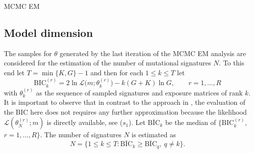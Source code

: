 \documentclass{bioinfo}
\makeatletter
\def\BState{\State\hskip-\ALG@thistlm}
\makeatother
\begin{document}
\begin{algorithm}
\caption{MCMC EM}\label{alg:mcmcem}
\end{algorithm}

\subsection{Model dimension}
The samples for $\theta$ generated by the last iteration of the
MCMC EM analysis are considered for the estimation of the number 
of mutational signatures $N$. To this end let $T = \min\{K, G\} - 1$
and then for each $1 \leq k \leq T$ let
\[
  \text{BIC}_k^{(r)} = 2\ln\mathcal L\big(m;
    \theta^{(r)}_{k}\big) - k(G+K)\ln G, \qquad r =1, \ldots,
    R
\]
with $\theta^{(r)}_k$ as the sequence of sampled signatures and
exposure matrices of rank $k$. It is important to observe that in
contrast to the approach in \cite{FICMV}, the evaluation of the BIC
here does not requires any further approximation because the
likelihood $\mathcal L(\theta^{(r)}_N; m)$ is directly available, see
($s_1$).  Let $\overline{\text{BIC}}_k$ be the median of 
$\{\text{BIC}_k^{(r)}$, $r = 1, \ldots, R\}$. The number of signatures
$N$ is estimated as
\[
   N 
   = 
   \big\{1 \leq k \leq T:  \overline{\text{BIC}}_k \geq
    \overline{\text{BIC}}_q,\ q\neq k \big\}.
\]
\end{document}
